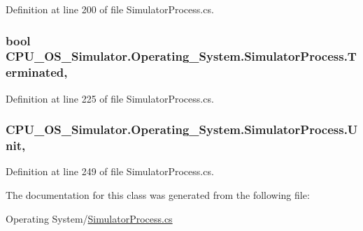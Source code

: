 Definition at line 200 of file Simulator\+Process.\+cs.

\hypertarget{class_c_p_u___o_s___simulator_1_1_operating___system_1_1_simulator_process_a46466d1ba03a308d1aede92e004f8926}{}
\subsubsection[{Terminated}]{\setlength{\rightskip}{0pt plus 5cm}bool C\+P\+U\+\_\+\+O\+S\+\_\+\+Simulator.\+Operating\+\_\+\+System.\+Simulator\+Process.\+Terminated\hspace{0.3cm}{\ttfamily [get]}, {\ttfamily [set]}}\label{class_c_p_u___o_s___simulator_1_1_operating___system_1_1_simulator_process_a46466d1ba03a308d1aede92e004f8926}


Definition at line 225 of file Simulator\+Process.\+cs.

\hypertarget{class_c_p_u___o_s___simulator_1_1_operating___system_1_1_simulator_process_ab00659160e7658c9d07136a1785c6d64}{}
\subsubsection[{Unit}]{ C\+P\+U\+\_\+\+O\+S\+\_\+\+Simulator.\+Operating\+\_\+\+System.\+Simulator\+Process.\+Unit\hspace{0.3cm}{\ttfamily [get]}, {\ttfamily [set]}}\label{class_c_p_u___o_s___simulator_1_1_operating___system_1_1_simulator_process_ab00659160e7658c9d07136a1785c6d64}


Definition at line 249 of file Simulator\+Process.\+cs.



The documentation for this class was generated from the following file\+:\begin{DoxyCompactItemize}
\item 
Operating System/\hyperlink{_simulator_process_8cs}{Simulator\+Process.\+cs}\end{DoxyCompactItemize}

